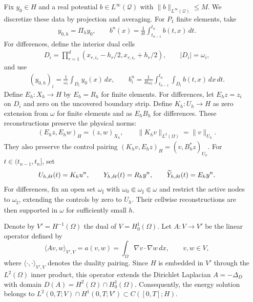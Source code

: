 \documentclass[print,wide,eng]{draft}
\begin{document}
Fix $y_0\in H$ and a real potential $b\in L^\infty(\mathcal Q)$ with $\|b\|_{L^\infty(\mathcal Q)}\leq M$. We discretize these data by projection and averaging. For $P_1$ finite elements, take\vspace{-2mm}
%
\begin{align}\label{eq:conv-data-fe}
y_{0,h}=\Pi_hy_0,\qquad b^n(x)=\frac1{\delta t}\int_{t_{n-1}}^{t_n}b(t,x)\,dt.
\end{align}
%
For differences, define the interior dual cells\vspace{-2mm}
%
\begin{align}\label{eq:conv-dual-cells}
D_i=\prod_{r=1}^d(x_{r,i_r}-h_r/2,x_{r,i_r}+h_r/2),
\qquad |D_i|=\omega_i,
\end{align}
%
and use\vspace{-2mm}
%
\begin{align}\label{eq:conv-data-fd}
(y_{0,h})_i=\frac1{\omega_i}\int_{D_i}y_0(x)\,dx,\qquad
b_i^n=\frac1{{\delta t}\omega_i}\int_{t_{n-1}}^{t_n}\int_{D_i}b(t,x)\,dx\,dt.
\end{align}
%
Define $E_h:X_h\to H$ by $E_h=R_h$ for finite elements. For differences, let $E_hz=z_i$ on $D_i$ and zero on the uncovered boundary strip. Define $K_h:U_h\to H$ as zero extension from $\omega$ for finite elements and as $E_hB_h$ for differences. These reconstructions preserve the physical norms:
%
\begin{align}\label{eq:conv-pairings}
(E_hz,E_hw)_H=(z,w)_{X_h},\qquad
\|K_hv\|_{L^2(\Omega)}=\|v\|_{U_h}.
\end{align}
%
They also preserve the control pairing $
(K_hv,E_hz)_H=(v,B_h^*z)_{U_h}$.
For $t\in(t_{n-1},t_n]$, set\vspace{-3mm}
%
$$
U_{h,{\delta t}}(t)=K_hu^n,\qquad
Y_{h,{\delta t}}(t)=R_hy^n,\qquad
\widetilde Y_{h,{\delta t}}(t)=E_hy^n.\vspace{-2mm}
$$
%
For differences, fix an open set $\omega_\sharp$ with $\omega_0\Subset\omega_\sharp\Subset\omega$ and restrict the active nodes to $\omega_\sharp$, extending the controls by zero to $U_h$. Their cellwise reconstructions are then supported in $\omega$ for sufficiently small $h$.

Denote by $V'=H^{-1}(\Omega)$ the dual of $V=H_0^1(\Omega)$. Let $A:V\to V'$ be the linear operator defined by
%
$$
\langle Av,w\rangle_{V',V}=a(v,w)=\int_\Omega\nabla v\cdot\nabla w\,dx,
\qquad v,w\in V,
$$
%
where $\langle\cdot,\cdot\rangle_{V',V}$ denotes the duality pairing. Since $H$ is embedded in $V'$ through the $L^2(\Omega)$ inner product, this operator extends the Dirichlet Laplacian $A=-\Delta_D$ with domain $D(A)=H^2(\Omega)\cap H_0^1(\Omega)$. Consequently, the energy solution belongs to $L^2(0,T;V)\cap H^1(0,T;V')\subset C([0,T];H)$.
\end{document}
